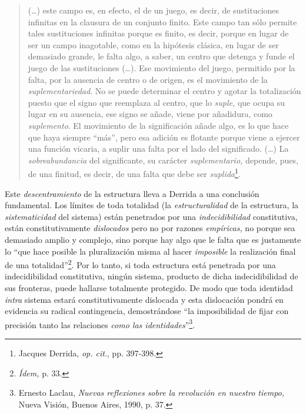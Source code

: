 \begin{quote}
(\dots) este campo es, en efecto, el de un juego, es decir, de sustituciones infinitas en la clausura de un conjunto finito. Este campo tan sólo permite tales sustituciones infinitas porque es finito, es decir, porque en lugar de ser un campo inagotable, como en la hipótesis clásica, en lugar de ser demasiado grande, le falta algo, a saber, un centro que detenga y funde el juego de las sustituciones (\dots). Ese movimiento del juego, permitido por la falta, por la ausencia de centro o de origen, es el movimiento de la \emph{suplementariedad}. No se puede determinar el centro y agotar la totalización puesto que el signo que reemplaza al centro, que lo \emph{suple,} que ocupa su lugar en su ausencia, ese signo se añade, viene por añadidura, como \emph{suplemento}. El movimiento de la significación añade algo, es lo que hace que haya siempre \enquote{más}, pero esa adición es flotante porque viene a ejercer una función vicaria, a suplir una falta por el lado del significado. (\dots) La \emph{sobreabundancia} del significante, su carácter \emph{suplementario,} depende, pues, de una finitud, es decir, de una falta que debe ser \emph{suplida}\footnote{Jacques Derrida, \emph{op. cit}., pp. 397-398.}.
\end{quote}

Este \emph{descentramiento} de la estructura lleva a Derrida a una conclusión fundamental. Los límites de toda totalidad (la \emph{estructuralidad} de la estructura, la \emph{sistematicidad} del sistema) están penetrados por una \emph{indecidibilidad} constitutiva, están constitutivamente \emph{dislocados} pero no por razones \emph{empíricas,} no porque sea demasiado amplio y complejo, sino porque hay algo que le falta  que es justamente lo \enquote{que hace posible la pluralización misma al hacer \emph{imposible} la realización final de una totalidad}\footnote{\emph{Ídem,} p. 33.}. Por lo tanto, si toda estructura está penetrada por una indecidibilidad constitutiva, ningún sistema, producto de dicha indecidibilidad de sus fronteras, puede hallarse totalmente protegido. De modo que toda identidad \emph{intra} sistema estará constitutivamente dislocada y esta dislocación pondrá en evidencia su radical contingencia, demostrándose \enquote{la imposibilidad de fijar con precisión  tanto las relaciones \emph{como las identidades}}\footnote{Ernesto Laclau, \emph{Nuevas reflexiones sobre la revolución en nuestro tiempo,} Nueva Visión, Buenos Aires, 1990, p. 37.}.

